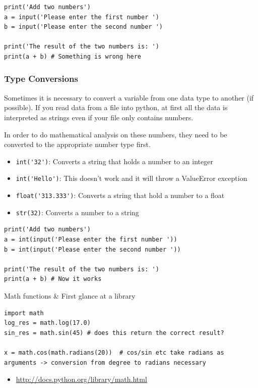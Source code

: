 \documentclass[10pt, a4paper]{beamer} %
\begin{document}
\begin{frame}
\begin{lstlisting}
print('Add two numbers')
a = input('Please enter the first number ')
b = input('Please enter the second number ')

print('The result of the two numbers is: ')
print(a + b) # Something is wrong here
\end{lstlisting}


\framebreak
\frametitle{Type Conversions}
Sometimes it is necessary to convert a variable from one data type to another (if possible). If you 
read data from a file into python, at first all the data is interpreted as strings even if your file only
contains numbers.

In order to do mathematical analysis on these numbers, they need to be converted to the appropriate number type first.

\begin{itemize}
  \item \lstinline!int('32')!: Converts a string that holds a number to an integer
  \item \lstinline!int('Hello')!: This doesn't work and it will throw a ValueError exception
  \item \lstinline!float('313.333')!: Converts a string that hold a number to a float
  \item \lstinline!str(32)!: Converts a number to a string
\end{itemize}

\begin{examples}
\begin{lstlisting}
print('Add two numbers')
a = int(input('Please enter the first number '))
b = int(input('Please enter the second number '))

print('The result of the two numbers is: ')
print(a + b) # Now it works
\end{lstlisting}
\end{examples}

\framebreak

\begin{block}{Math functions \& First glance at a library}
  \begin{lstlisting}
import math
log_res = math.log(17.0)
sin_res = math.sin(45) # does this return the correct result?

x = math.cos(math.radians(20))  # cos/sin etc take radians as arguments -> conversion from degree to radians necessary    
  \end{lstlisting}
  \begin{itemize}
    \item \tiny \url{http://docs.python.org/library/math.html}
  \end{itemize}
\end{block}


\end{frame}
\end{document}
